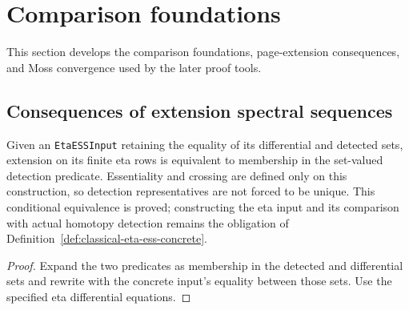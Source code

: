 \section{Comparison foundations}
\label{chap:comparison-and-rules}

This section develops the comparison foundations, page-extension consequences,
and Moss convergence used by the later proof tools.

\subsection{Consequences of extension spectral sequences}

\begin{proposition}
  \label{prop:classical-eta-extension-iff-detected}
  \leanok
  Given an \texttt{EtaESSInput} retaining the equality of its differential
  and detected sets, extension on its finite eta rows is equivalent to membership in
  the set-valued detection predicate.  Essentiality and crossing are defined
  only on this construction, so detection representatives are not forced to
  be unique. This conditional equivalence is proved; constructing the
  eta input and its comparison with actual homotopy detection remains
  the obligation of Definition~\ref{def:classical-eta-ess-concrete}.
\end{proposition}

\begin{proof}
  \leanok
  Expand the two predicates as membership in the detected and differential
  sets and rewrite with the concrete input's equality between those sets.
  Use the specified eta differential equations.
\end{proof}

